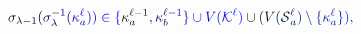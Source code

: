 \documentclass[12pt]{article}
\begin{document}
\makeatletter
\renewcommand*{\@textcolor}[3]{%
  \protect\leavevmode
  \begingroup
    \color#1{#2}#3%
  \endgroup
}
\makeatother
\begin{displaymath}
\mathcolor[RGB]{0,0,15}{\sigma} _ { \mathcolor[RGB]{0,0,30}{\lambda} \mathcolor[RGB]{0,0,45}{-} \mathcolor[RGB]{0,0,60}{1} } \mathcolor[RGB]{0,0,75}{(} \mathcolor[RGB]{0,0,90}{\sigma} _ { \mathcolor[RGB]{0,0,105}{\lambda} } ^ { \mathcolor[RGB]{0,0,120}{-} \mathcolor[RGB]{0,0,135}{1} } \mathcolor[RGB]{0,0,150}{(} \mathcolor[RGB]{0,0,165}{\kappa} _ { \mathcolor[RGB]{0,0,180}{a} } ^ { \mathcolor[RGB]{0,0,195}{\ell} } \mathcolor[RGB]{0,0,210}{)} \mathcolor[RGB]{0,0,225}{)} \mathcolor[RGB]{0,0,240}{\in} \mathcolor[RGB]{0,0,255}{\{} \mathcolor[RGB]{0,15,0}{\kappa} _ { \mathcolor[RGB]{0,15,15}{a} } ^ { \mathcolor[RGB]{0,15,30}{\ell} \mathcolor[RGB]{0,15,45}{-} \mathcolor[RGB]{0,15,60}{1} } \mathcolor[RGB]{0,15,75}{,} \mathcolor[RGB]{0,15,90}{\kappa} _ { \mathcolor[RGB]{0,15,105}{b} } ^ { \mathcolor[RGB]{0,15,120}{\ell} \mathcolor[RGB]{0,15,135}{-} \mathcolor[RGB]{0,15,150}{1} } \mathcolor[RGB]{0,15,165}{\}} \mathcolor[RGB]{0,15,180}{\cup} \mathcolor[RGB]{0,15,195}{V} \mathcolor[RGB]{0,15,210}{(} \mathcal { \mathcolor[RGB]{0,15,225}{K} } ^ { \mathcolor[RGB]{0,15,240}{\ell} } \mathcolor[RGB]{0,15,255}{)} \mathcolor[RGB]{0,30,0}{\cup} \mathcolor[RGB]{0,30,15}{(} \mathcolor[RGB]{0,30,30}{V} \mathcolor[RGB]{0,30,45}{(} \mathcal { \mathcolor[RGB]{0,30,60}{S} } _ { \mathcolor[RGB]{0,30,75}{a} } ^ { \mathcolor[RGB]{0,30,90}{\ell} } \mathcolor[RGB]{0,30,105}{)} \mathcolor[RGB]{0,30,120}{\setminus} \mathcolor[RGB]{0,30,135}{\{} \mathcolor[RGB]{0,30,150}{\kappa} _ { \mathcolor[RGB]{0,30,165}{a} } ^ { \mathcolor[RGB]{0,30,180}{\ell} } \mathcolor[RGB]{0,30,195}{\}} \mathcolor[RGB]{0,30,210}{)} \mathcolor[RGB]{0,30,225}{,}
\end{displaymath}
\end{document}
